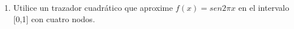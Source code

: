 
\begin{enumerate}
    \item Utilice un trazador cuadrático que aproxime \( f(x) = sen2\pi x \) en el intervalo [0,1] con cuatro \gls{nodos}.
\end{enumerate}